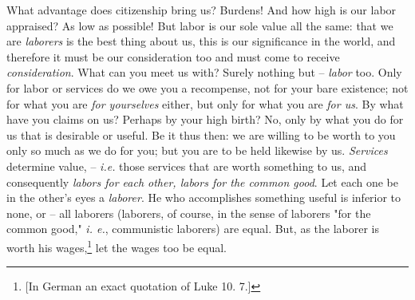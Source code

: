 What advantage does citizenship bring us? Burdens! And how high is our labor 
appraised? As low as possible! But labor is our sole value all the same: that 
we are \textit{laborers} is the best thing about us, this is our significance 
in the world, and therefore it must be our consideration too and must come to 
receive \textit{consideration}. What can you meet us with? Surely nothing but 
-- \textit{labor} too. Only for labor or services do we owe you a recompense, 
not for your bare existence; not for what you are \textit{for yourselves} 
either, but only for what you are \textit{for us}. By what have you claims on 
us? Perhaps by your high birth? No, only by what you do for us that is 
desirable or useful. Be it thus then: we are willing to be worth to you only 
so much as we do for you; but you are to be held likewise by us. 
\textit{Services} determine value, -- \textit{i.e.} those services that are 
worth something to us, and consequently \textit{labors for each other, labors 
for the common good}. Let each one be in the other's eyes a \textit{laborer}. 
He who accomplishes something useful is inferior to none, or -- all laborers 
(laborers, of course, in the sense of laborers "{}for the common good,"{} 
\textit{i. e.}, communistic laborers) are equal. But, as the laborer is worth 
his wages,\footnote{[In German an exact quotation of Luke 10. 7.]} let the 
wages too be equal.

